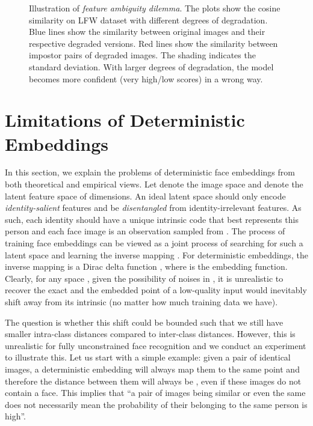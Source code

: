 \documentclass[10pt,twocolumn,letterpaper]{article}
\begin{document}
\begin{figure*}[t]
\begin{minipage}{0.33\linewidth}
    \end{minipage}\hfill
    \caption{ Illustration of \textit{feature ambiguity dilemma}. The plots show the cosine similarity on LFW dataset with different degrees of degradation. Blue lines show the similarity between original images and their respective degraded versions. Red lines show the similarity between impostor pairs of degraded images. The shading indicates the standard deviation. With larger degrees of degradation, the model becomes more confident (very high/low scores) in a wrong way.}\vspace{-1.3em}
    \label{fig:dilemma}
\end{figure*}


\section{Limitations of Deterministic Embeddings}
\label{sec:motivation}

In this section, we explain the problems of deterministic face embeddings from both theoretical and empirical views. Let  denote the image space and  denote the latent feature space of  dimensions. An ideal latent space  should only encode \textit{identity-salient} features and be \textit{disentangled} from identity-irrelevant features. As such, each identity should have a unique intrinsic code  that best represents this person and each face image  is an observation sampled from . The process of training face embeddings can be viewed as a joint process of searching for such a latent space  and learning the inverse mapping . For deterministic embeddings, the inverse mapping is a Dirac delta function , where  is the embedding function. Clearly, for any space , given the possibility of noises in , it is unrealistic to recover the exact  and the embedded point of a low-quality input would inevitably shift away from its intrinsic  (no matter how much training data we have). 

The question is whether this shift could be bounded such that we still have smaller intra-class distances compared to inter-class distances. However, this is unrealistic for fully unconstrained face recognition and we conduct an experiment to illustrate this. Let us start with a simple example: given a pair of identical images, a deterministic embedding will always map them to the same point and therefore the distance between them will always be , even if these images do not contain a face. This implies that ``a pair of images being similar or even the same does not necessarily mean the probability of their belonging to the same person is high''. 
\end{document}
